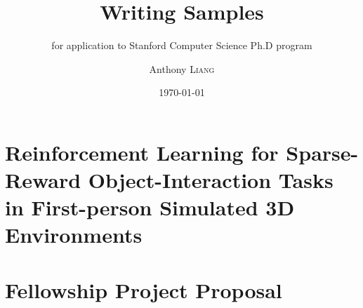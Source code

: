\documentclass[a4paper, 12pt]{report}
\title{Writing Samples}
\subtitle{for application to Stanford Computer Science Ph.D program}
\author{Anthony \textsc{Liang}}
\date{\today}
\begin{document}
    \maketitle
    \romantableofcontents

    \chapter{Reinforcement Learning for Sparse-Reward Object-Interaction Tasks in First-person Simulated 3D Environments}
    \chapter{Fellowship Project Proposal}
\end{document}
